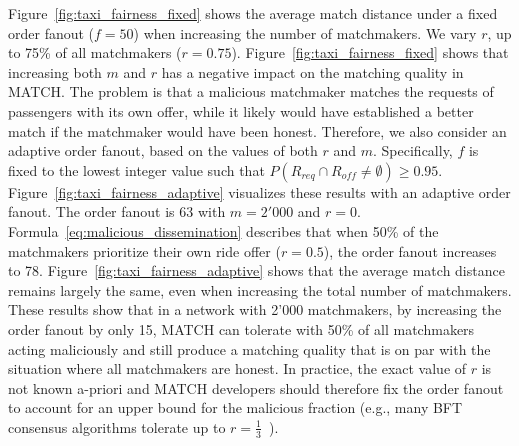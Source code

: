 Figure~\ref{fig:taxi_fairness_fixed} shows the average match distance under a fixed order fanout ($ f = 50 $) when increasing the number of matchmakers.
We vary $ r $, up to 75\% of all matchmakers ($ r = 0.75 $).
Figure~\ref{fig:taxi_fairness_fixed} shows that increasing both $ m $ and $ r $ has a negative impact on the matching quality in MATCH.
The problem is that a malicious matchmaker matches the requests of passengers with its own offer, while it likely would have established a better match if the matchmaker would have been honest.
Therefore, we also consider an adaptive order fanout, based on the values of both $ r $ and $ m $.
Specifically, $ f $ is fixed to the lowest integer value such that $ P(R_{req} \cap R_{off} \neq \emptyset) \geq 0.95 $.
Figure~\ref{fig:taxi_fairness_adaptive} visualizes these results with an adaptive order fanout.
The order fanout is 63 with $ m = 2'000 $ and $ r=0 $.
Formula~\ref{eq:malicious_dissemination} describes that when 50\% of the matchmakers prioritize their own ride offer ($ r=0.5 $), the order fanout increases to 78.
Figure~\ref{fig:taxi_fairness_adaptive} shows that the average match distance remains largely the same, even when increasing the total number of matchmakers.
These results show that in a network with 2'000 matchmakers, by increasing the order fanout by only 15, MATCH can tolerate with 50\% of all matchmakers acting maliciously and still produce a matching quality that is on par with the situation where all matchmakers are honest.
In practice, the exact value of $ r $ is not known a-priori and MATCH developers should therefore fix the order fanout to account for an upper bound for the malicious fraction (e.g., many BFT consensus algorithms tolerate up to $ r = \frac{1}{3} $~\cite{castro1999practical}).


